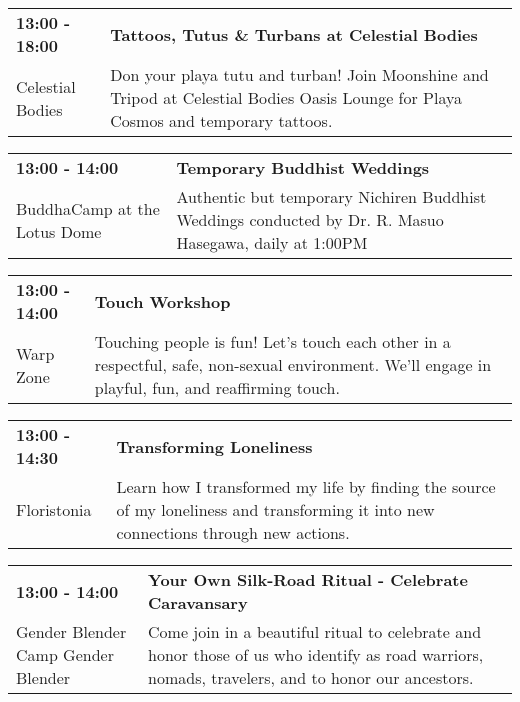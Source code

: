 \begin{tabular}{ p{1in} p{2.2in} }
    \textbf{13:00 - 18:00} & \textbf{Tattoos, Tutus \& Turbans at Celestial Bodies} \\
    Celestial Bodies \newline  & Don your playa tutu and turban! Join Moonshine and Tripod at Celestial Bodies Oasis Lounge for Playa Cosmos and temporary tattoos. \\
    \hline 
\end{tabular}
    
\begin{tabular}{ p{1in} p{2.2in} }
    \textbf{13:00 - 14:00} & \textbf{Temporary Buddhist Weddings} \\
    BuddhaCamp at the Lotus Dome \newline  & Authentic but temporary Nichiren Buddhist Weddings conducted by Dr. R. Masuo Hasegawa, daily at 1:00PM \\
    \hline 
\end{tabular}
    
\begin{tabular}{ p{1in} p{2.2in} }
    \textbf{13:00 - 14:00} & \textbf{Touch Workshop} \\
    Warp Zone \newline  & Touching people is fun! Let's touch each other in a respectful, safe, non-sexual environment. We'll engage in playful, fun, and reaffirming touch. \\
    \hline 
\end{tabular}
    
\begin{tabular}{ p{1in} p{2.2in} }
    \textbf{13:00 - 14:30} & \textbf{ Transforming Loneliness} \\
    Floristonia \newline  & Learn how I transformed my life by finding the source of my loneliness and transforming it into new connections through new actions. \\
    \hline 
\end{tabular}
    
\begin{tabular}{ p{1in} p{2.2in} }
    \textbf{13:00 - 14:00} & \textbf{Your Own Silk-Road Ritual - Celebrate Caravansary } \\
    Gender Blender \newline Camp Gender Blender & Come join in a beautiful ritual to celebrate and honor those of us who identify as road warriors, nomads, travelers, and to honor our ancestors. \\
    \hline 
\end{tabular}
    
